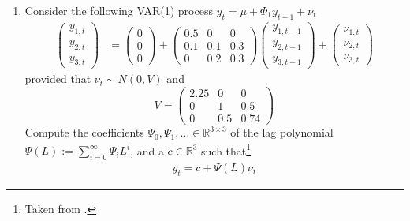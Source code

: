 \begin{enumerate}
    \item Consider the following VAR(1) process $y_t = \mu + \Phi_1 y_{t-1} + \nu_t$
          \begin{align*}
              \begin{pmatrix} y_{1,t} \\ y_{2,t} \\ y_{3,t} \end{pmatrix}
               & = \begin{pmatrix} 0 \\ 0 \\ 0 \end{pmatrix}
              + \begin{pmatrix}
                    0.5 & 0   & 0   \\
                    0.1 & 0.1 & 0.3 \\
                    0   & 0.2 & 0.3
                \end{pmatrix}
              \begin{pmatrix}
                  y_{1, {t-1}} \\ y_{2, {t-1}} \\ y_{3, {t-1}}
              \end{pmatrix}
              + \begin{pmatrix}
                    \nu_{1,t} \\ \nu_{2,t} \\ \nu_{3,t}
                \end{pmatrix}
          \end{align*}
          provided that $\nu_t \sim N(0, V)$ and
          \[
              V
              = \begin{pmatrix}
                  2.25 & 0 & 0 \\ 0 & 1 & 0.5 \\ 0 & 0.5 & 0.74
              \end{pmatrix}
          \]
          Compute the coefficients $\Psi_0, \Psi_1, \dots \in \mathbb{R}^{3\times 3}$ of the lag polynomial $\Psi(L) := \sum_{i=0}^\infty \Psi_i L^i$, and a $c \in \mathbb{R}^3$ such that\footnote{Taken from \cite[][See section 16, "Understanding multivariate time series concepts"]{Mutschler-2018-github_repo}.}
          \begin{align*}
              y_t = c + \Psi(L) \nu_t
          \end{align*}


\end{enumerate}
